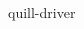 \documentclass[11pt,letterpaper,openany]{scrbook}
\begin{document}
\begin{sloppypar}
		
		\begin{paracol}{2}
			
			\leftfont \internallinenumbers \begin{linenumbers} quill-driver\end{linenumbers} \resetlinenumber[1]
			
\end{paracol}\end{sloppypar}
\end{document}
